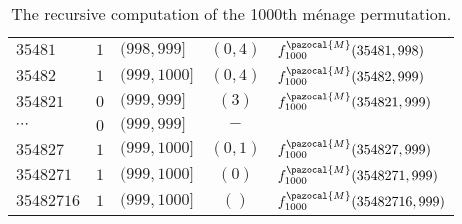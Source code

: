 \begin{table}
\begin{tabular}{|l|r|l|c|l|}
    $35481   $ & $1$   & $(998,999]$        & $(0,4)$   & $f_{1000}^\pazocal{M}(35481,998)$    \\
    $35482   $ & $1$   & $(999,1000]$       & $(0,4)$   & $f_{1000}^\pazocal{M}(35482,999)$    \\ \hline
    $354821  $ & $0$   & $(999,999]$        & $(3)$     & $f_{1000}^\pazocal{M}(354821,999)$   \\
    $\cdots$   & $0$   & $(999,999]$        & $-$       & \\
    $354827  $ & $1$   & $(999,1000]$       & $(0,1)$   & $f_{1000}^\pazocal{M}(354827,999)$   \\ \hline
    $3548271 $ & $1$   & $(999,1000]$       & $(0)$     & $f_{1000}^\pazocal{M}(3548271,999)$  \\ \hline
    $35482716$ & $1$   & $(999,1000]$       & $()$      & $f_{1000}^\pazocal{M}(35482716,999)$ \\ \hline
  \end{tabular}
  \caption[Steps for computing the $1000$th m\'enage permutation in $S_8$.]{
    The recursive computation of the 1000th m\'enage permutation.
  }
\label{table:unrankMenage}
\end{table}
